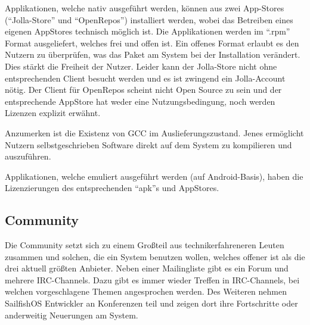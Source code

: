 Applikationen, welche nativ ausgeführt werden, können aus zwei App-Stores (``\mbox{Jolla-Store}'' und ``\mbox{OpenRepos}''\thinspace\cite{online:openrepos}) installiert werden, wobei das Betreiben eines eigenen AppStores technisch möglich ist. Die Applikationen werden im ``\mbox{.rpm}'' Format ausgeliefert, welches frei und offen ist\thinspace\cite{online:rpm-license}. Ein offenes Format erlaubt es den Nutzern zu überprüfen, was das Paket am System bei der Installation verändert. Dies stärkt  die Freiheit der Nutzer. Leider kann der \mbox{Jolla-Store} nicht ohne entsprechenden Client besucht werden und es ist zwingend ein Jolla-Account nötig\thinspace\cite{online:jolla-store}. Der Client für \mbox{OpenRepos} scheint nicht Open Source zu sein und der entsprechende AppStore hat weder eine Nutzungsbedingung, noch werden Lizenzen explizit erwähnt.

Anzumerken ist die Existenz von GCC im Auslieferungszustand. Jenes ermöglicht Nutzern selbstgeschrieben Software direkt auf dem System zu kompilieren\thinspace\cite{online:sailfish-list-licenses} und auszuführen.

Applikationen, welche emuliert ausgeführt werden (auf Android-Basis), haben die Lizenzierungen des entsprechenden ``apk''s und AppStores.
\newline

\subsection{Community}
Die Community setzt sich zu einem Großteil aus technikerfahreneren Leuten zusammen und solchen, die ein System benutzen wollen, welches offener ist als die drei aktuell größten Anbieter. Neben einer Mailingliste gibt es ein Forum und mehrere \mbox{IRC-Channels}\thinspace\cite{online:sailfish-communitygeneral}. Dazu gibt es immer wieder Treffen in \mbox{IRC-Channels}, bei welchen vorgeschlagene Themen angesprochen werden. Des Weiteren nehmen \mbox{SailfishOS} Entwickler an Konferenzen teil und zeigen dort ihre Fortschritte oder anderweitig Neuerungen am System.
\iffalse
\subsubsection{Developer Support}
\thinspace\cite{online:jolla-store-terms}
https://harbour.jolla.com/\\
https://github.com/sailfishos\\
https://talk.maemo.org/showthread.php?t=92852\\
http://talk.maemo.org/showthread.php?p=1482661\#post1482661\\
https://github.com/maliit\\
https://talk.maemo.org/showthread.php?t=92036\\
\fi
\newline

